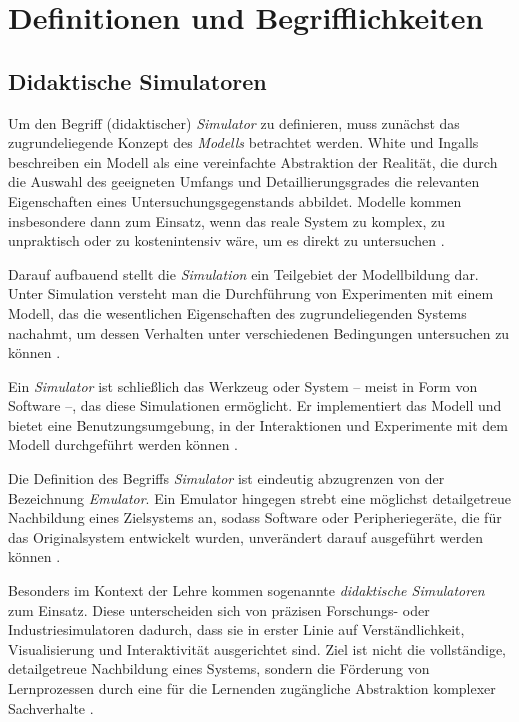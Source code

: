 \section{Definitionen und Begrifflichkeiten}

\subsection{Didaktische Simulatoren}
Um den Begriff (didaktischer) \textit{Simulator} zu definieren, muss zunächst das zugrundeliegende Konzept des \textit{Modells} betrachtet werden. White und Ingalls~\parencite[S.~12]{white_introduction_2009} beschreiben ein Modell als eine vereinfachte Abstraktion der Realität, die durch die Auswahl des geeigneten Umfangs und Detaillierungsgrades die relevanten Eigenschaften eines Untersuchungsgegenstands abbildet. Modelle kommen insbesondere dann zum Einsatz, wenn das reale System zu komplex, zu unpraktisch oder zu kostenintensiv wäre, um es direkt zu untersuchen \parencite[S.~5]{banks_what_2008}.

Darauf aufbauend stellt die \textit{Simulation} ein Teilgebiet der Modellbildung dar. Unter Simulation versteht man die Durchführung von Experimenten mit einem Modell, das die wesentlichen Eigenschaften des zugrundeliegenden Systems nachahmt, um dessen Verhalten unter verschiedenen Bedingungen untersuchen zu können \parencites[S.~12]{white_introduction_2009}[S.~6]{banks_what_2008}.

Ein \textit{Simulator} ist schließlich das Werkzeug oder System -- meist in Form von Software --, das diese Simulationen ermöglicht. Er implementiert das Modell und bietet eine Benutzungsumgebung, in der Interaktionen und Experimente mit dem Modell durchgeführt werden können \parencite[S.~304f]{duran_what_2020}.

Die Definition des Begriffs \textit{Simulator} ist eindeutig abzugrenzen von der Bezeichnung \textit{Emulator}. Ein Emulator hingegen strebt eine möglichst detailgetreue Nachbildung eines Zielsystems an, sodass Software oder Peripheriegeräte, die für das Originalsystem entwickelt wurden, unverändert darauf ausgeführt werden können \parencite[S.~1683]{mcgregor_relationship_2002}.

Besonders im Kontext der Lehre kommen sogenannte \textit{didaktische Simulatoren} zum Einsatz. Diese unterscheiden sich von präzisen Forschungs- oder Industriesimulatoren dadurch, dass sie in erster Linie auf Verständlichkeit, Visualisierung und Interaktivität ausgerichtet sind. Ziel ist nicht die vollständige, detailgetreue Nachbildung eines Systems, sondern die Förderung von Lernprozessen durch eine für die Lernenden zugängliche Abstraktion komplexer Sachverhalte \parencites[S.~256]{muller_entwicklung_2020}[S.~1]{nystrom_teaching_2024}.


